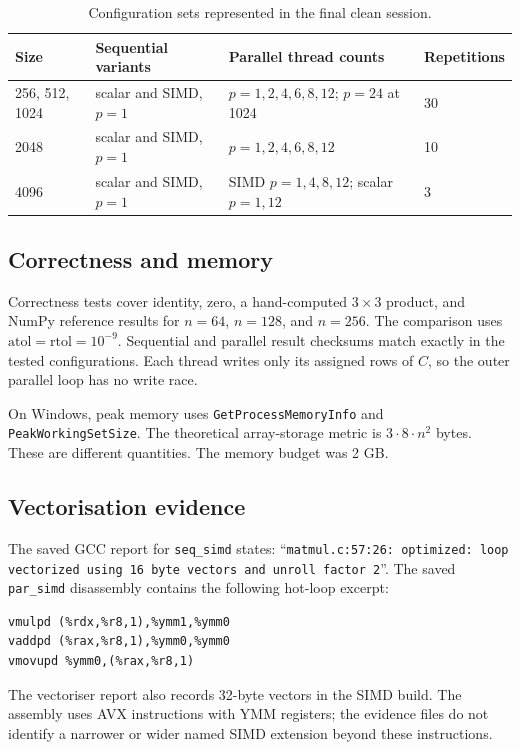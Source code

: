 \documentclass[a4paper,11pt]{article}
\begin{document}
\begin{table}[htbp]
\centering
\caption{Configuration sets represented in the final clean session.}
\begin{tabular}{@{}llll@{}}
\toprule
Size & Sequential variants & Parallel thread counts & Repetitions\\
\midrule
256, 512, 1024 & scalar and SIMD, $p=1$ &
$p=1,2,4,6,8,12$; $p=24$ at 1024 & 30\\
2048 & scalar and SIMD, $p=1$ &
$p=1,2,4,6,8,12$ & 10\\
4096 & scalar and SIMD, $p=1$ &
SIMD $p=1,4,8,12$; scalar $p=1,12$ & 3\\
\bottomrule
\end{tabular}
\end{table}

\subsection{Correctness and memory}

Correctness tests cover identity, zero, a hand-computed $3\times3$ product,
and NumPy reference results for $n=64$, $n=128$, and $n=256$. The comparison
uses $\mathrm{atol}=\mathrm{rtol}=10^{-9}$. Sequential and parallel result
checksums match exactly in the tested configurations. Each thread writes
only its assigned rows of $C$, so the outer parallel loop has no write race.

On Windows, peak memory uses \texttt{GetProcessMemoryInfo} and
\texttt{PeakWorkingSetSize}. The theoretical array-storage metric is
$3\cdot8\cdot n^2$ bytes. These are different quantities. The memory budget
was 2 GB.

\setcounter{subsection}{5}
\subsection{Vectorisation evidence}

The saved GCC report for \texttt{seq\_simd} states: ``\texttt{matmul.c:57:26:
optimized: loop vectorized using 16 byte vectors and unroll factor 2}''.
The saved \texttt{par\_simd} disassembly contains the following hot-loop
excerpt:
\begin{verbatim}
vmulpd (%rdx,%r8,1),%ymm1,%ymm0
vaddpd (%rax,%r8,1),%ymm0,%ymm0
vmovupd %ymm0,(%rax,%r8,1)
\end{verbatim}
The vectoriser report also records 32-byte vectors in the SIMD build. The
assembly uses AVX instructions with YMM registers; the evidence files do not
identify a narrower or wider named SIMD extension beyond these instructions.
\end{document}
